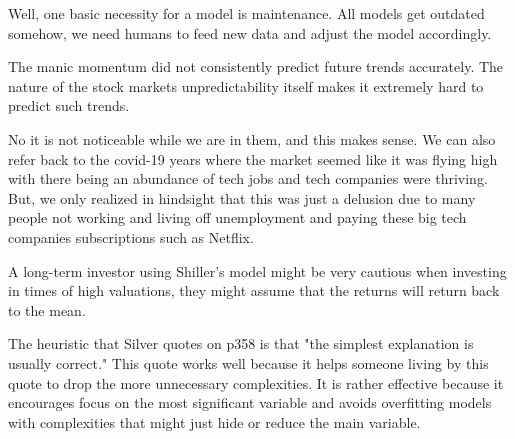 \documentclass[12pt]{article}
\begin{document}
\begin{enumerate}

Well, one basic necessity for a model is maintenance. All models get outdated somehow, we need humans to feed new data and adjust the model accordingly.



The manic momentum did not consistently predict future trends accurately. The nature of the stock markets unpredictability itself makes it extremely hard to predict such trends.


No it is not noticeable while we are in them, and this makes sense. We can also refer back to the covid-19 years where the market seemed like it was flying high with there being an abundance of tech jobs and tech companies were thriving. But, we only realized in hindsight that this was just a delusion due to many people not working and living off unemployment and paying these big tech companies subscriptions such as Netflix.


A long-term investor using Shiller's model might be very cautious when investing in times of high valuations, they might assume that the returns will return back to the mean.


The heuristic that Silver quotes on p358 is that "the simplest explanation is usually correct." This quote works well because it helps someone living by this quote to drop the more unnecessary complexities. It is rather effective because it encourages focus on the most significant variable and avoids overfitting models with complexities that might just hide or reduce the main variable.


\end{enumerate}
\end{document}
